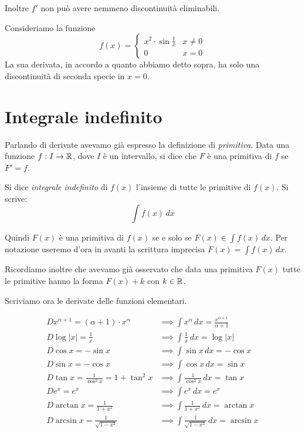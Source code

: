 Inoltre $f'$ non può avere nemmeno discontinuità eliminabili.

\begin{example}
Consideriamo la funzione
\begin{equation*}
f(x) = \begin{cases}
x^2 \cdot \sin \frac{1}{x} & x \neq 0 \\
0 & x = 0
\end{cases}
\end{equation*}
La sua derivata, in accordo a quanto abbiamo detto sopra, ha solo una discontinuità di seconda specie in $x = 0$.
\end{example}

\section{Integrale indefinito}

Parlando di derivate avevamo già espresso la definizione di \emph{primitiva}. Data una funzione $f: I \to \mathbb R$, dove $I$ è un intervallo, si dice che $F$ è una primitiva di $f$ se $F' = f$.

\begin{definition}
Si dice \emph{integrale indefinito} di $f(x)$ l'insieme di tutte le primitive di $f(x)$. Si scrive:
\begin{equation*}
\int f(x)\, dx
\end{equation*}
\end{definition}

Quindi $F(x)$ è una primitiva di $f(x)$ se e solo se $F(x) \in \int f(x) \, dx$. Per notazione useremo d'ora in avanti la scrittura imprecisa $F(x) = \int f(x) \, dx$.

Ricordiamo inoltre che avevamo già osservato che data una primitiva $F(x)$ tutte le primitive hanno la forma $F(x) + k$ con $k \in \mathbb R$.

Scriviamo ora le derivate delle funzioni elementari.

\begin{align*}
D x^{\alpha+1} = (\alpha+1) \cdot x^\alpha &\implies \int x^\alpha \, dx = \frac{x^{\alpha+1}}{\alpha+1} \\
D \log |x| = \frac{1}{x} &\implies \int \frac{1}{x} \, dx = \log |x| \\
D \cos x = -\sin x &\implies \int \sin x \, dx = -\cos x \\
D \sin x = -\cos x &\implies \int \cos x \, dx = \sin x\\
D \tan x = \frac{1}{\cos^2 x} = 1 + \tan^2 x &\implies \int \frac{1}{\cos^2 x} \, dx = \tan x \\
D e^x = e^x &\implies \int e^x \, dx = e^x \\
D \arctan x = \frac{1}{1+x^2} &\implies \int \frac{1}{1+x^2} \, dx = \arctan x \\
D \arcsin x = \frac{1}{\sqrt{1-x^2}} &\implies \int \frac{1}{\sqrt{1-x^2}}  \, dx = \arcsin x \\
\end{align*}

